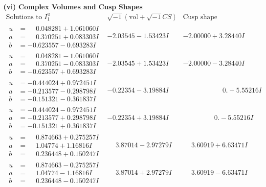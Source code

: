 \documentclass[1p]{elsarticle_modified}
\theoremstyle{definition}
\newcommand{\I}{\sqrt{-1}}
\begin{document}
\newpage\flushleft \textbf{(vi) Complex Volumes and Cusp Shapes}
$$\begin{array}{c|c|c}  
\text{Solutions to }I^u_{1}& \I (\text{vol} + \sqrt{-1}CS) & \text{Cusp shape}\\
 \hline 
\begin{aligned}
u &= \phantom{-}0.048281 + 1.061060 I \\
a &= \phantom{-}0.370251 + 0.083303 I \\
b &= -0.623557 - 0.693283 I\end{aligned}
 & -2.03545 - 1.53423 I & -2.00000 + 3.28440 I \\ \hline\begin{aligned}
u &= \phantom{-}0.048281 - 1.061060 I \\
a &= \phantom{-}0.370251 - 0.083303 I \\
b &= -0.623557 + 0.693283 I\end{aligned}
 & -2.03545 + 1.53423 I & -2.00000 - 3.28440 I \\ \hline\begin{aligned}
u &= -0.444024 + 0.972451 I \\
a &= -0.213577 - 0.298798 I \\
b &= -0.151321 - 0.361837 I\end{aligned}
 & -0.22354 - 3.19884 I & \phantom{-0.000000 -}0. + 5.55216 I \\ \hline\begin{aligned}
u &= -0.444024 - 0.972451 I \\
a &= -0.213577 + 0.298798 I \\
b &= -0.151321 + 0.361837 I\end{aligned}
 & -0.22354 + 3.19884 I & \phantom{-0.000000 } 0. - 5.55216 I \\ \hline\begin{aligned}
u &= \phantom{-}0.874663 + 0.275257 I \\
a &= \phantom{-}1.04774 + 1.16816 I \\
b &= \phantom{-}0.236448 + 0.150247 I\end{aligned}
 & \phantom{-}3.87014 - 2.97279 I & \phantom{-}3.60919 + 6.63471 I \\ \hline\begin{aligned}
u &= \phantom{-}0.874663 - 0.275257 I \\
a &= \phantom{-}1.04774 - 1.16816 I \\
b &= \phantom{-}0.236448 - 0.150247 I\end{aligned}
 & \phantom{-}3.87014 + 2.97279 I & \phantom{-}3.60919 - 6.63471 I \\ \hline\begin{aligned}

\end{aligned}
\end{array}$$
\end{document}
